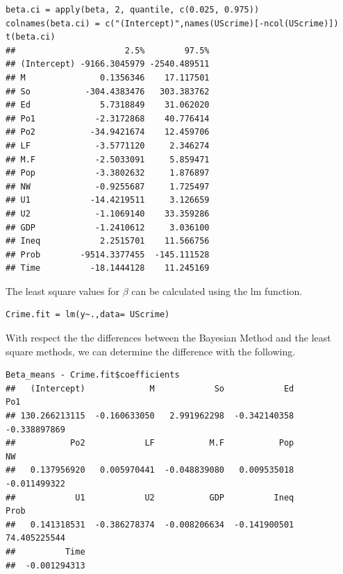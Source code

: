 \documentclass{article}\usepackage[]{graphicx}\usepackage[]{color}
\makeatletter
\newenvironment{kframe}{%
 \def\at@end@of@kframe{}%
 \ifinner\ifhmode%
  \def\at@end@of@kframe{\end{minipage}}%
  \begin{minipage}{\columnwidth}%
 \fi\fi%
 \def\FrameCommand##1{\hskip\@totalleftmargin \hskip-\fboxsep
 \colorbox{shadecolor}{##1}\hskip-\fboxsep
     \hskip-\linewidth \hskip-\@totalleftmargin \hskip\columnwidth}%
 \MakeFramed {\advance\hsize-\width
   \@totalleftmargin\z@ \linewidth\hsize
   \@setminipage}}%
 {\par\unskip\endMakeFramed%
 \at@end@of@kframe}
\newenvironment{knitrout}{}{} %
\makeatother
\begin{document}
\begin{knitrout}
\color{fgcolor}\begin{kframe}
\begin{verbatim}
beta.ci = apply(beta, 2, quantile, c(0.025, 0.975))
colnames(beta.ci) = c("(Intercept)",names(UScrime)[-ncol(UScrime)])
t(beta.ci)
##                      2.5%        97.5%
## (Intercept) -9166.3045979 -2540.489511
## M               0.1356346    17.117501
## So           -304.4383476   303.383762
## Ed              5.7318849    31.062020
## Po1            -2.3172868    40.776414
## Po2           -34.9421674    12.459706
## LF             -3.5771120     2.346274
## M.F            -2.5033091     5.859471
## Pop            -3.3802632     1.876897
## NW             -0.9255687     1.725497
## U1            -14.4219511     3.126659
## U2             -1.1069140    33.359286
## GDP            -1.2410612     3.036100
## Ineq            2.2515701    11.566756
## Prob        -9514.3377455  -145.111528
## Time          -18.1444128    11.245169
\end{verbatim}
\end{kframe}
\end{knitrout}
The least square values for $\beta$ can be calculated using the lm function.
\begin{knitrout}
\color{fgcolor}\begin{kframe}
\begin{verbatim}
Crime.fit = lm(y~.,data= UScrime)
\end{verbatim}
\end{kframe}
\end{knitrout}
With respect the the differences between the Bayesian Method and the least square methods, we can determine the difference with the following.
\begin{knitrout}
\color{fgcolor}\begin{kframe}
\begin{verbatim}
Beta_means - Crime.fit$coefficients
##   (Intercept)             M            So            Ed           Po1 
## 130.266213115  -0.160633050   2.991962298  -0.342140358  -0.338897869 
##           Po2            LF           M.F           Pop            NW 
##   0.137956920   0.005970441  -0.048839080   0.009535018  -0.011499322 
##            U1            U2           GDP          Ineq          Prob 
##   0.141318531  -0.386278374  -0.008206634  -0.141900501  74.405225544 
##          Time 
##  -0.001294313
\end{verbatim}
\end{kframe}
\end{knitrout}
\end{document}

